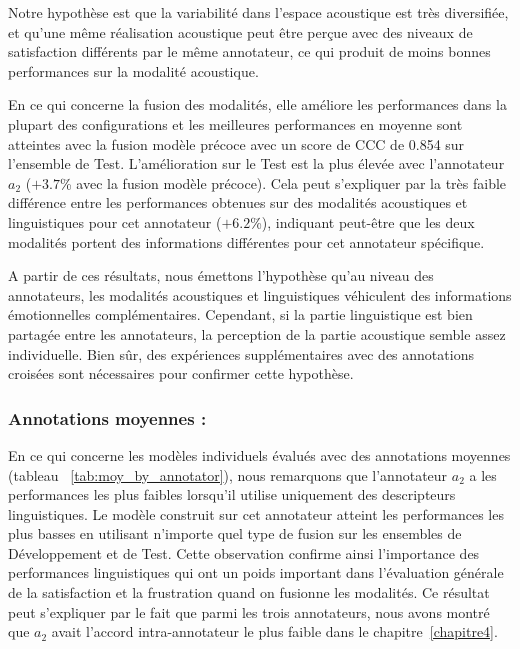 Notre hypothèse est que la variabilité dans l'espace acoustique est très diversifiée, et qu'une même réalisation acoustique peut être perçue avec des niveaux de satisfaction différents par le même annotateur, ce qui produit de moins bonnes performances sur la modalité acoustique.

En ce qui concerne la fusion des modalités, elle améliore les performances dans la plupart des configurations et les meilleures performances en moyenne sont atteintes avec la fusion modèle précoce avec un score de CCC de 0.854 sur l'ensemble de Test. L'amélioration sur le Test est la plus élevée avec l'annotateur $a_2$ ($+3.7$\% avec la fusion modèle précoce).
Cela peut s'expliquer par la très faible différence entre les performances obtenues sur des modalités acoustiques et linguistiques pour cet annotateur ($+6.2$\%), indiquant peut-être que les deux modalités portent des informations différentes pour cet annotateur spécifique.

A partir de ces résultats, nous émettons l'hypothèse qu'au niveau des annotateurs, les modalités acoustiques et linguistiques véhiculent des informations émotionnelles complémentaires. Cependant, si la partie linguistique est bien partagée entre les annotateurs, la perception de la partie acoustique semble assez individuelle.
Bien sûr, des expériences supplémentaires avec des annotations croisées sont nécessaires pour confirmer cette hypothèse.

\subsubsection{Annotations moyennes : }



En ce qui concerne les modèles individuels évalués avec des annotations moyennes (tableau ~\ref{tab:moy_by_annotator}), nous remarquons que l'annotateur $a_2$ a les performances les plus faibles lorsqu'il utilise uniquement des descripteurs linguistiques.
Le modèle construit sur cet annotateur atteint les performances les plus basses en utilisant n'importe quel type de fusion sur les ensembles de Développement et de Test.
Cette observation confirme ainsi l'importance des performances linguistiques qui ont un poids important dans l'évaluation générale de la satisfaction et la frustration quand on fusionne les modalités.
Ce résultat peut s'expliquer par le fait que parmi les trois annotateurs, nous avons montré que $a_2$ avait l'accord intra-annotateur le plus faible dans le chapitre~\ref{chapitre4}.


